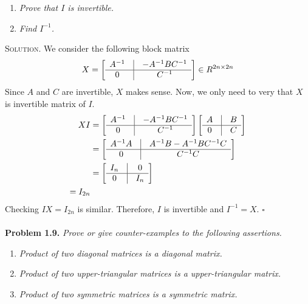 \documentclass[a4paper,oneside]{book}
\numberwithin{equation}{chapter}
\begin{document}
\begin{enumerate}
\item \textit{Prove that $I$ is invertible.}
\item \textit{Find $I^{-1}$.}
\end{enumerate}
\textsc{Solution.} We consider the following block matrix
\begin{align}
X = \left[ {\begin{array}{*{20}{c}}
{{A^{ - 1}}}&\vline& { - {A^{ - 1}}B{C^{ - 1}}}\\
\hline
0&\vline& {{C^{ - 1}}}
\end{array}} \right] \in {R^{2n \times 2n}}
\end{align}
Since $A$ and $C$ are invertible, $X$ makes sense. Now, we only need to very that $X$ is invertible matrix of $I$.
\begin{align}
XI &= \left[ {\begin{array}{*{20}{c}}
{{A^{ - 1}}}&\vline& { - {A^{ - 1}}B{C^{ - 1}}}\\
\hline
0&\vline& {{C^{ - 1}}}
\end{array}} \right]\left[ {\begin{array}{*{20}{c}}
A&\vline& B\\
\hline
0&\vline& C
\end{array}} \right]\\
 &= \left[ {\begin{array}{*{20}{c}}
{{A^{ - 1}}A}&\vline& {{A^{ - 1}}B - {A^{ - 1}}B{C^{ - 1}}C}\\
\hline
0&\vline& {{C^{ - 1}}C}
\end{array}} \right]\\
 &= \left[ {\begin{array}{*{20}{c}}
{{I_n}}&\vline& 0\\
\hline
0&\vline& {{I_n}}
\end{array}} \right]\\
 = {I_{2n}}
\end{align}
Checking $IX=I_{2n}$ is similar. Therefore, $I$ is invertible and $I^{-1}=X$. \hfill $\square$\\
\\
\textbf{Problem 1.9.} \textit{Prove or give counter-examples to the following assertions.}
\begin{enumerate}
\item \textit{Product of two diagonal matrices is a diagonal matrix.}
\item \textit{Product of two upper-triangular matrices is a upper-triangular matrix.}
\item \textit{Product of two symmetric matrices is a symmetric matrix.}
\end{enumerate}
\end{document}
